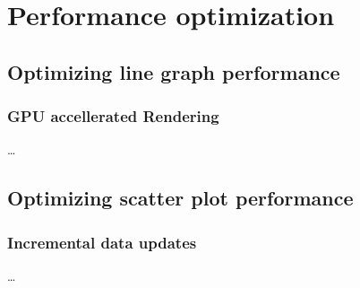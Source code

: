 

\chapter{Performance optimization}
\label{ch:optimization}

\section{Optimizing line graph performance}
\label{sec:optimization:lines}



\subsection{GPU accellerated Rendering}
\label{sec:optimization:lines:opengl}

\dots

\section{Optimizing scatter plot performance}
\label{sec:optimization:SecondSection}

\subsection{Incremental data updates}

\dots
